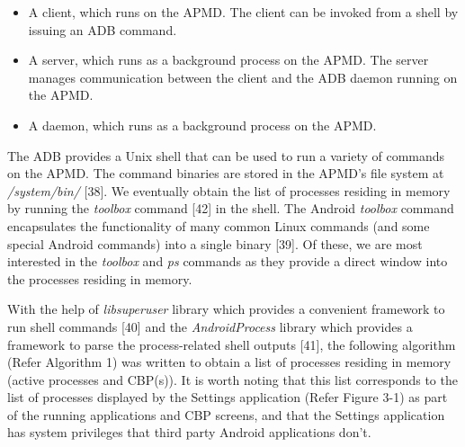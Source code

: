 \documentclass[12pt]{uthesis-v12}  %
\begin{document}
			\begin{itemize}
				\item A client, which runs on the APMD. The client can be invoked from a shell by issuing an ADB command.
				\item A server, which runs as a background process on the APMD. The server manages communication between the client and the ADB daemon running on the APMD.
				\item A daemon, which runs as a background process on the APMD.
			\end{itemize}
			
			The ADB provides a Unix shell that can be used to run a variety of commands on the APMD. The command binaries are stored in the APMD's file system at {\em /system/bin/} [38]. We eventually obtain the list of processes residing in memory by running the {\em toolbox} command [42] in the shell. The Android {\em toolbox} command encapsulates the functionality of many common Linux commands (and some special Android commands) into a single binary [39]. Of these, we are most interested in the {\em toolbox} and {\em ps} commands as they provide a direct window into the processes residing in memory. 
			
%			
%			
			With the help of {\em libsuperuser} library which provides a convenient framework to run shell commands [40] and the {\em AndroidProcess} library which provides a framework to parse the process-related shell outputs [41], the following algorithm (Refer Algorithm 1) was written to obtain a list of processes residing in memory (active processes and CBP(s)). It is worth noting that this list corresponds to the list of processes displayed by the Settings application (Refer Figure 3-1) as part of the running applications and CBP screens, and that the Settings application has system privileges that third party Android applications don't.\\ 
			
\end{document}

